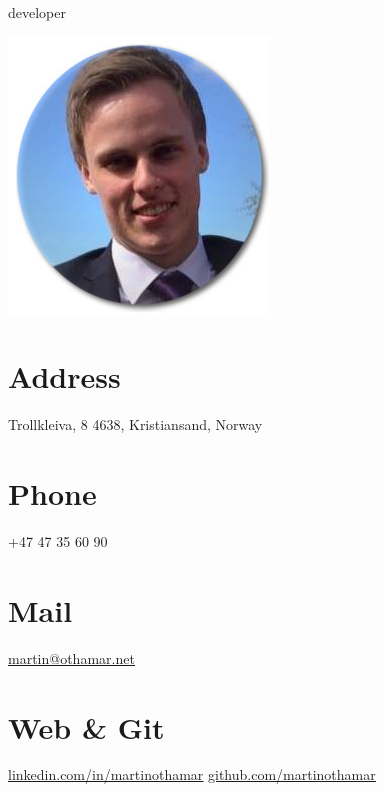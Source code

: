 \documentclass[]{cv-class}
\begin{document}
      {developer}
      
\vspace{1.15cm}  

\begin{aside}
  \includegraphics[scale=0.40]{img/meg2.jpg}
  	~
  \section{Address}
    Trollkleiva, 8
    4638, Kristiansand, Norway
    ~
  \section{Phone}
    +47 47 35 60 90
    ~
  \section{Mail}
    \underline{\href{mailto:martin@othamar.net}{martin@othamar.net}}
    ~
  \section{Web \& Git}
    \underline{\href{https://no.linkedin.com/in/martinothamar}{linkedin.com/in/martinothamar}}
    \underline{\href{https://github.com/martinothamar}{github.com/martinothamar}}
    ~

\end{aside}
\end{document}
